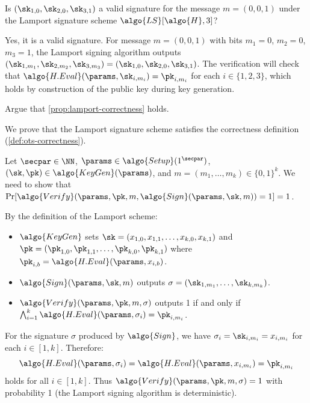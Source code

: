 \begin{exercise}
  Is $(\sk_{1,0}, \sk_{2,0}, \sk_{3,1})$ a valid signature for the message $m = (0, 0, 1)$ under the Lamport signature scheme $\algo{LS}[\algo{H}, 3]$?
\end{exercise}

\ifsolutions
\begin{mysolution}
  Yes, it is a valid signature.
  For message $m = (0, 0, 1)$ with bits $m_1 = 0$, $m_2 = 0$, $m_3 = 1$, the Lamport signing algorithm outputs $(\sk_{1,m_1}, \sk_{2,m_2}, \sk_{3,m_3}) = (\sk_{1,0}, \sk_{2,0}, \sk_{3,1})$.
  The verification will check that $\algo{H.Eval}(\params, \sk_{i,m_i}) = \pk_{i,m_i}$ for each $i \in \{1,2,3\}$, which holds by construction of the public key during key generation.
\end{mysolution}
\fi

\begin{exercise}\label{ex:lamport-correctness}
  Argue that \autoref{prop:lamport-correctness} holds.
\end{exercise}

\ifsolutions
\begin{mysolution}
  We prove that the Lamport signature scheme satisfies the correctness definition (\autoref{def:ots-correctness}).
  
  Let $\secpar \in \NN$, $\params \in \algo{Setup}(1^\secpar)$, $(\sk, \pk) \in \algo{KeyGen}(\params)$, and $m = (m_1, \ldots, m_k) \in \{0,1\}^k$.
  We need to show that $\Pr[\algo{Verify}(\params, \pk, m, \algo{Sign}(\params, \sk, m)) = 1] = 1$.
  
  By the definition of the Lamport scheme:
  \begin{itemize}
    \item $\algo{KeyGen}$ sets $\sk = (x_{1,0}, x_{1,1}, \ldots, x_{k,0}, x_{k,1})$ and $\pk = (\pk_{1,0}, \pk_{1,1}, \ldots, \pk_{k,0}, \pk_{k,1})$ where $\pk_{i,b} = \algo{H.Eval}(\params, x_{i,b})$.
    \item $\algo{Sign}(\params, \sk, m)$ outputs $\sigma = (\sk_{1,m_1}, \ldots, \sk_{k,m_k})$.
    \item $\algo{Verify}(\params, \pk, m, \sigma)$ outputs 1 if and only if $\bigwedge_{i=1}^k \algo{H.Eval}(\params, \sigma_i) = \pk_{i,m_i}$.
  \end{itemize}
  
  For the signature $\sigma$ produced by $\algo{Sign}$, we have $\sigma_i = \sk_{i,m_i} = x_{i,m_i}$ for each $i \in [1,k]$.
  Therefore:
  \[
    \algo{H.Eval}(\params, \sigma_i) = \algo{H.Eval}(\params, x_{i,m_i}) = \pk_{i,m_i}
  \]
  holds for all $i \in [1,k]$.
  Thus $\algo{Verify}(\params, \pk, m, \sigma) = 1$ with probability 1 (the Lamport signing algorithm is deterministic).
\end{mysolution}
\fi

